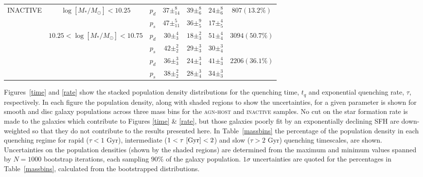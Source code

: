 \begin{table}
\begin{tabular}{c|c|c|c|c|c|c}
\multirow{6}{*}{INACTIVE}  & \multirow{2}{*}{$\log [M_*/M_{\odot}] < 10.25 $}                       & $p_d$     & $37\pm_{14}^{8}$                    & $39\pm_{6}^{8}$                    & $24\pm_{6}^{8}$        & \multirow{2}{*}{$807 (13.2\%)$}                      \\
                           &                                                 & $p_s$     & $47\pm_{11}^{5}$                    & $36\pm_{5}^{9}$                    & $17\pm_{5}^{4}$        &                                                      \\ \cline{2-7} 
                           & \multirow{2}{*}{$10.25 < \log [M_*/M_{\odot}] < 10.75$}                    & $p_d$     &          $30\pm_{3}^{4}$                          &       $18\pm_{3}^{2}$                            &    $51\pm_{4}^{4}$                   & \multirow{2}{*}{$3094 (50.7\%)$}                     \\
                           &                                                 & $p_s$     & $42\pm_{2}^{2}$            & $29\pm_{3}^{3}$   & $30\pm_{4}^{3}$ &                                                      \\ \cline{2-7} 
                           & {\multirow{2}{*}{$\log [M_*/M_{\odot}] > 10.75$}} & $p_d$     & $36\pm_{3}^{3}$            & $24\pm_{4}^{3}$         & $41\pm_{3}^{4}$ & \multicolumn{1}{l}{\multirow{2}{*}{$2206 (36.1\%)$}} \\
                           & \multicolumn{1}{l|}{}                           & $p_s$      & $38\pm_{2}^{2}$              & $28\pm_{4}^{3}$            & $34\pm_{3}^{3}$ & \multicolumn{1}{l}{}                                 \\ \hline                       
\end{tabular}
\end{table}

Figures~\ref{time} and \ref{rate} show the stacked population density distributions for the quenching time, $t_q$ and exponential quenching rate, $\tau$, respectively. In each figure the population density, along with shaded regions to show the uncertainties, for a given parameter is shown for smooth and disc galaxy populations across three mass bins for the \textsc{agn-host} and \textsc{inactive} samples. No cut on the star formation rate is made to the galaxies which contribute to Figures \ref{time} \& \ref{rate}, but those galaxies poorly fit by an exponentially declining SFH are down-weighted so that they do not contribute to the results presented here. In Table~\ref{massbins} the percentage of the  population density in each quenching regime for rapid ($\tau < 1$ Gyr), intermediate ($1 < \tau ~\rm{[Gyr]} < 2$) and slow ($\tau > 2$ Gyr) quenching timescales, are shown. Uncertainties on the population densities (shown by the shaded regions) are determined from the maximum and minimum values spanned by $N = 1000$ bootstrap iterations, each sampling $90\%$ of the galaxy population. $1\sigma$ uncertainties are quoted for the percentages in Table~\ref{massbins}, calculated from the bootstrapped distributions.

